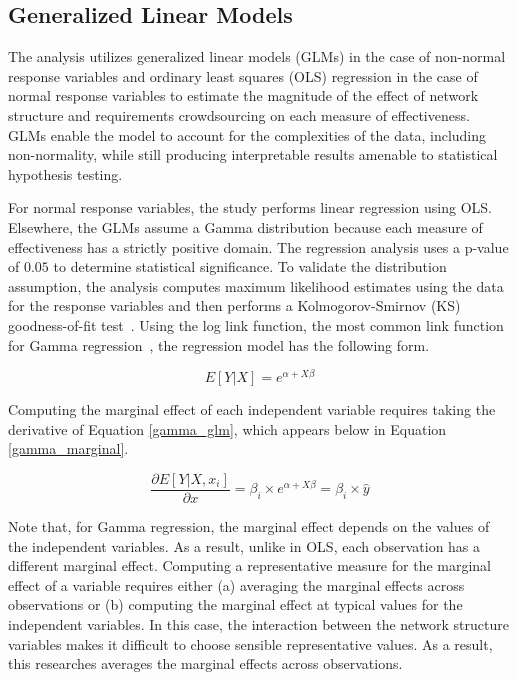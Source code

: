 \subsection{Generalized Linear Models}
\label{glm}

The analysis utilizes generalized linear models (GLMs) in the case of non-normal response variables and ordinary least squares (OLS) regression in the case of normal response variables to estimate the magnitude of the effect of network structure and requirements crowdsourcing on each measure of effectiveness. GLMs enable the model to account for the complexities of the data, including non-normality, while still producing interpretable results amenable to statistical hypothesis testing.

For normal response variables, the study performs linear regression using OLS. Elsewhere, the GLMs assume a Gamma distribution because each measure of effectiveness has a strictly positive domain. The regression analysis uses a p-value of $0.05$ to determine statistical significance. To validate the distribution assumption, the analysis computes maximum likelihood estimates using the data for the response variables and then performs a Kolmogorov-Smirnov (KS) goodness-of-fit test~\cite{wackerly, massey}. Using the log link function, the most common link function for Gamma regression~\cite{fahrmeir}, the regression model has the following form.

\begin{equation}
\label{gamma_glm}
    E[Y|X] = e^{\alpha + X \beta}
\end{equation}

Computing the marginal effect of each independent variable requires taking the derivative of Equation \ref{gamma_glm}, which appears below in Equation \ref{gamma_marginal}.

\begin{equation}
\label{gamma_marginal}
\frac{\partial E[Y|X, x_i]}{\partial x} = \beta_i \times e^{\alpha + X \beta}  = \beta_i \times \hat{y}
\end{equation}

Note that, for Gamma regression, the marginal effect depends on the values of the independent variables. As a result, unlike in OLS, each observation has a different marginal effect. Computing a representative measure for the marginal effect of a variable requires either (a) averaging the marginal effects across observations or (b) computing the marginal effect at typical values for the independent variables. In this case, the interaction between the network structure variables makes it difficult to choose sensible representative values. As a result, this researches averages the marginal effects across observations.

